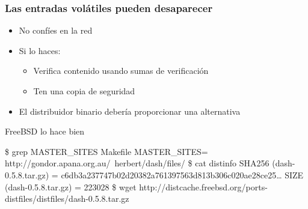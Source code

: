 \documentclass[14pt,aspectratio=169]{beamer}
\begin{document}
\begin{frame}[plain]
\end{frame}

\begin{frame}[fragile]
 \frametitle{Las entradas volátiles pueden desaparecer}

 \begin{itemize}
  \item No confíes en la red
  \item Si lo haces:
   \begin{itemize}
    \item Verifica contenido usando sumas de verificación
    \item Ten una copia de seguridad
   \end{itemize}
  \item El distribuidor binario debería proporcionar una alternativa
\end{itemize}

\begin{block}{\small FreeBSD lo hace bien}\footnotesize
\begin{semiverbatim}
\$ grep MASTER\_SITES Makefile
MASTER\_SITES= http://gondor.apana.org.au/~herbert/dash/files/
\$ cat distinfo
SHA256 (dash-0.5.8.tar.gz) = c6db3a237747b02d20382a761397563d813b306c020ae28ce25…
SIZE (dash-0.5.8.tar.gz) = 223028
\$ wget http://distcache.freebsd.org/ports-distfiles/distfiles/dash-0.5.8.tar.gz
\end{semiverbatim}
\end{block}
\end{frame}
\end{document}
